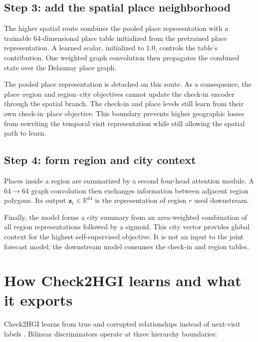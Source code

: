 \subsection{Step 3: add the spatial place neighborhood}

The higher spatial route combines the pooled place representation with a trainable
64-dimensional place table initialized from the pretrained place representation.
A learned scalar, initialized to $1.0$, controls the table's contribution. One
weighted graph convolution then propagates the combined state over the Delaunay
place graph.

The pooled place representation is detached on this route. As a consequence, the
place--region and region--city objectives cannot update the check-in encoder through
the spatial branch. The check-in and place levels still learn from their own
check-in--place objective. This boundary prevents higher geographic losses from
rewriting the temporal visit representation while still allowing the spatial path
to learn.

\subsection{Step 4: form region and city context}

Places inside a region are summarized by a second four-head attention module. A
$64\rightarrow64$ graph convolution then exchanges information between adjacent
region polygons. Its output $\mathbf{z}_r\in\mathbb{R}^{64}$ is the representation
of region $r$ used downstream.

Finally, the model forms a city summary from an area-weighted combination of all
region representations followed by a sigmoid. This city vector provides global
context for the highest self-supervised objective. It is not an input to the joint
forecast model; the downstream model consumes the check-in and region tables.

\section{How Check2HGI learns and what it exports}
\label{sec:apx-check2hgi-learning}

Check2HGI learns from true and corrupted relationships instead of next-visit labels
\cite{velickovic2019deep,huang2023hgi}. Bilinear discriminators operate at three
hierarchy boundaries:

